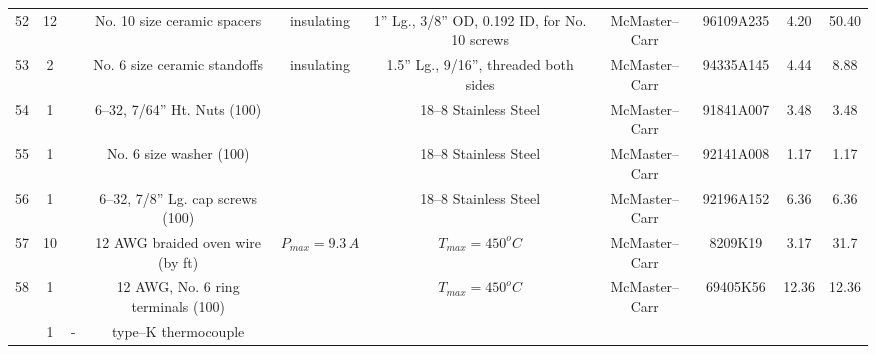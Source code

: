 \documentclass[10pt, twocolumn]{article}
\begin{document}
\begin{center}
\begin{adjustbox}{max width=\textwidth}
\begin{tabular}{c c c c c c c c c c}
52	&12	&	&No. 10 size ceramic spacers	&insulating	&1” Lg., 3/8” OD, 0.192 ID, for No. 10 screws
	&McMaster--Carr	&96109A235		&4.20	&50.40	\\

53	&2	&	&No. 6 size ceramic standoffs	&insulating	&1.5” Lg., 9/16”, threaded both sides
	&McMaster--Carr	&94335A145		&4.44	&8.88	\\

54	&1	&	&6--32, 7/64” Ht. Nuts (100)	&	&18--8 Stainless Steel
	&McMaster--Carr	&91841A007		&3.48	&3.48	\\

55	&1	&	&No. 6 size washer (100)	&	&18--8 Stainless Steel
	&McMaster--Carr	&92141A008		&1.17	&1.17	\\

56	&1	&	&6--32, 7/8” Lg. cap screws (100)	&	&18--8 Stainless Steel
	&McMaster--Carr	&92196A152		&6.36	&6.36	\\

57	&10	&	&12 AWG braided oven wire (by ft)	&$P_{max}=9.3\,A$	&$T_{max}=450^{o}C$
	&McMaster--Carr	&8209K19		&3.17	&31.7	\\

58	&1	&	&12 AWG, No. 6 ring terminals (100)	&	&$T_{max}=450^{o}C$
	&McMaster--Carr	&69405K56		&12.36	&12.36	\\

	&1	&-	&type--K thermocouple	&				&
	&			&			&		&	\\

\hline\hline
\end{tabular}
\end{adjustbox}
\label{mcmaster-bill-of-materials}
\end{center}
\end{document}
